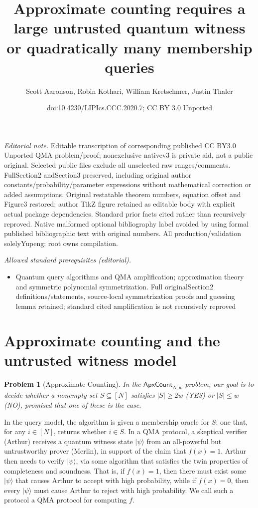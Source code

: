 \documentclass[10pt,a4paper]{article}
\title{Approximate counting requires a large untrusted quantum witness or quadratically many membership queries}
\author{Scott Aaronson, Robin Kothari, William Kretschmer, Justin Thaler}
\date{doi:10.4230/LIPIcs.CCC.2020.7; CC BY 3.0 Unported}
\newtheorem{problem}[theorem]{Problem}
\newcommand{\<}{\langle}
\renewcommand{\>}{\rangle}
\newcommand{\ApxCount}{\mathsf{ApxCount}_{N,w}}
\begin{document}
\maketitle
\noindent\textit{Editorial note.} Editable transcription of corresponding published CC BY3.0 Unported QMA problem/proof; nonexclusive nativev3 is private aid, not a public original. Selected public files exclude all unselected raw ranges/comments. FullSection2 andSection3 preserved, including original author constants/probability/parameter expressions without mathematical correction or added assumptions. Original restatable theorem numbers, equation offset and Figure3 restored; author TikZ figure retained as editable body with explicit actual package dependencies. Standard prior facts cited rather than recursively reproved. Native malformed optional bibliography label avoided by using formal published bibliographic text with original numbers. All production/validation solelyYupeng; root owns compilation.\par\medskip
\noindent\textit{Allowed standard prerequisites (editorial).}\begin{itemize}
\item Quantum query algorithms and QMA amplification; approximation theory and symmetric polynomial symmetrization. Full originalSection2 definitions/statements, source-local symmetrization proofs and guessing lemma retained; standard cited amplification is not recursively reproved
\end{itemize}\medskip
\section*{Approximate counting and the untrusted witness model}
\begin{problem}[Approximate Counting]
In the $\ApxCount$ problem, our goal is to decide whether a nonempty set $S\subseteq[N]$ satisfies $|S|\ge2w$ (YES) or $|S|\le w$ (NO), promised that one of these is the case.
\end{problem}
In the query model, the algorithm is given a membership oracle for $S$: one that, for any $i\in[N]$, returns whether $i\in S$.
In a QMA protocol, a skeptical verifier (Arthur) receives a quantum witness state $|\psi\rangle$ from an all-powerful but untrustworthy prover (Merlin), in support of the claim that $f(x)=1$. Arthur then needs to verify $|\psi\rangle$, via some algorithm that satisfies the twin properties of completeness and soundness. That is, if $f(x)=1$, then there must exist some $|\psi\rangle$ that causes Arthur to accept with high probability, while if $f(x)=0$, then every $|\psi\rangle$ must cause Arthur to reject with high probability. We call such a protocol a QMA protocol for computing $f$.
\end{document}
